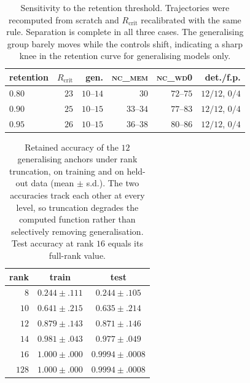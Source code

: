 \documentclass{article}
\begin{document}
\begin{table}[h]
	\centering
	\caption{Sensitivity to the retention threshold. Trajectories were recomputed from
		scratch and $R_{\text{crit}}$ recalibrated with the same rule. Separation is complete
		in all three cases. The generalising group barely moves while the controls shift,
		indicating a sharp knee in the retention curve for generalising models only.}
	\label{tab:retention}
	\vskip 0.0in
	\begin{small}
		\begin{tabular}{lrrrrr}
			\toprule
			retention & $R_{\text{crit}}$ & gen. & \textsc{nc\_mem} & \textsc{nc\_wd0} & det./f.p. \\
			\midrule
			$0.80$ & $23$ & $10$--$14$ & $30$ & $72$--$75$ & $12/12$, $0/4$ \\
			$0.90$ & $25$ & $10$--$15$ & $33$--$34$ & $77$--$83$ & $12/12$, $0/4$ \\
			$0.95$ & $26$ & $10$--$15$ & $36$--$38$ & $80$--$86$ & $12/12$, $0/4$ \\
			\bottomrule
		\end{tabular}
	\end{small}
\end{table}

\begin{table}[H]
	\caption{Retained accuracy of the $12$ generalising anchors under rank truncation, on
		training and on held-out data (mean $\pm$ s.d.). The two accuracies track each other at every
		level, so truncation degrades the computed function rather than selectively removing
		generalisation. Test accuracy at rank $16$ equals its full-rank value.}
	\label{tab:ranktest}
	\vskip 0.15in
	\begin{center}
		\begin{small}
			\begin{tabular}{rcc}
				\toprule
				rank & train & test \\
				\midrule
				$8$   & $0.244 \pm .111$ & $0.244 \pm .105$ \\
				$10$  & $0.641 \pm .215$ & $0.635 \pm .214$ \\
				$12$  & $0.879 \pm .143$ & $0.871 \pm .146$ \\
				$14$  & $0.981 \pm .043$ & $0.977 \pm .049$ \\
				$16$  & $1.000 \pm .000$ & $0.9994 \pm .0008$ \\
				$128$ & $1.000 \pm .000$ & $0.9994 \pm .0008$ \\
				\bottomrule
			\end{tabular}
		\end{small}
	\end{center}
	\vskip -0.35in
\end{table}
\end{document}

